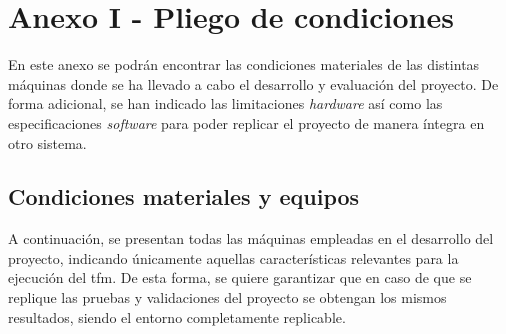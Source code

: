\chapter{Anexo I - Pliego de condiciones}
\label{ch:anexoPliegoCondiciones}

En este anexo se podrán encontrar las condiciones materiales de las distintas máquinas donde se ha llevado a cabo el desarrollo y evaluación del proyecto. De forma adicional, se han indicado las limitaciones \textit{hardware} así como las especificaciones \textit{software} para poder replicar el proyecto de manera íntegra en otro sistema.


\section{Condiciones materiales y equipos}


A continuación, se presentan todas las máquinas empleadas en el desarrollo del proyecto, indicando únicamente aquellas características relevantes para la ejecución del \gls{tfm}. De esta forma, se quiere garantizar que en caso de que se replique las pruebas y validaciones del proyecto se obtengan los mismos resultados, siendo el entorno completamente replicable.

